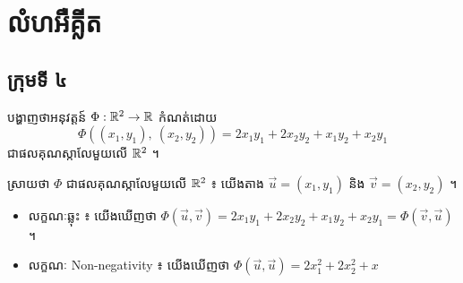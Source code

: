 



\renewcommand{\theexercise}{\thechapter{.}\arabic{exercise}}




\chapter{លំហអឺគ្លីត}

\section{ក្រុមទី ៤}

\setcounter{exercise}{6}
\begin{exercise}
	បង្ហាញថាអនុវត្តន៍ $\Phi:\R^2\to\R$ កំណត់ដោយ
  \[
    \Phi( (x_1,y_1),~(x_2,y_2) )=
    2x_1y_1+2x_2y_2+x_1y_2+x_2y_1
  \]
  ជាផលគុណស្កាលែមួយលើ $\R^2$ ។
\end{exercise}
\begin{solution}
	ស្រាយថា $\Phi$ ជាផលគុណស្កាលែមួយលើ $\R^2$ ៖ យើងតាង
  $\vec{u}=(x_1, y_1)$ និង $\vec{v}=(x_2, y_2)$ ។
  \begin{itemize}
  \item លក្ខណៈឆ្លុះ ៖
    យើងឃើញថា
    $\Phi(\vec{u}, \vec{v})=2x_1y_1+2x_2y_2+x_1y_2+x_2y_1=\Phi(\vec{v},\vec{u})$ ។
  \item លក្ខណៈ Non-negativity ៖
    យើងឃើញថា $\Phi(\vec{u},\vec{u})=2x_1^2+2x_2^2+x$
  \end{itemize}
\end{solution}



